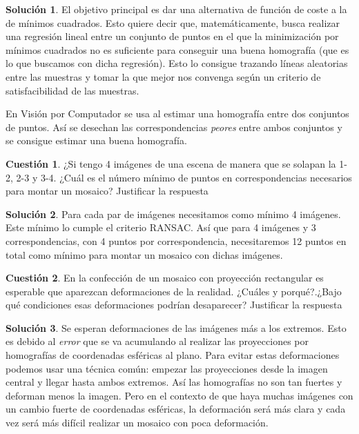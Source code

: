 \documentclass[a4paper, 11pt]{article}
\theoremstyle{definition}
\newtheorem{cuestion}{Cuestión}
\newtheorem*{solucion}{Solución}
\begin{document}
  \begin{solucion}
     	El objetivo principal es dar una alternativa de función de coste a la de mínimos
      cuadrados. Esto quiere decir que, matemáticamente, busca realizar una regresión
      lineal entre un conjunto de puntos en el que la minimización por mínimos cuadrados
      no es suficiente para conseguir una buena homografía (que es lo que buscamos con
      dicha regresión). Esto lo consigue trazando líneas aleatorias entre las muestras
      y tomar la que mejor nos convenga según un criterio de satisfacibilidad de las muestras.

      En Visión por Computador se usa al estimar una homografía entre dos conjuntos
      de puntos. Así se desechan las correspondencias \textit{peores} entre ambos conjuntos y se consigue
      estimar una buena homografía.
  \end{solucion}
  \begin{cuestion}
    ¿Si tengo 4 imágenes de una escena de manera que se solapan la 1-2, 2-3
    y 3-4. ¿Cuál es el número mínimo de puntos en correspondencias necesarios para
    montar un mosaico? Justificar la respuesta
  \end{cuestion}

  \begin{solucion}
     	Para cada par de imágenes necesitamos como mínimo 4 imágenes. Este mínimo lo
      cumple el criterio RANSAC. Así que para 4 imágenes y 3 correspondencias, con
      4 puntos por correspondencia, necesitaremos 12 puntos en total como mínimo
      para montar un mosaico con dichas imágenes.
  \end{solucion}

  \begin{cuestion}
    En la confección de un mosaico con proyección rectangular es esperable
   que aparezcan deformaciones de la realidad. ¿Cuáles y porqué?.¿Bajo qué
   condiciones esas deformaciones podrían desaparecer? Justificar la respuesta

  \end{cuestion}

  \begin{solucion}
    Se esperan deformaciones de las imágenes más a los extremos. Esto es debido al
    \textit{error} que se va acumulando al realizar las proyecciones por homografías
    de coordenadas esféricas al plano. Para evitar estas deformaciones podemos usar
    una técnica común: empezar las proyecciones desde la imagen central y llegar
    hasta ambos extremos. Así las homografías no son tan fuertes y deforman menos la imagen.
    Pero en el contexto de que haya muchas imágenes con un cambio fuerte de coordenadas
    esféricas, la deformación será más clara y cada vez será más difícil realizar
    un mosaico con poca deformación.
  \end{solucion}
\end{document}
